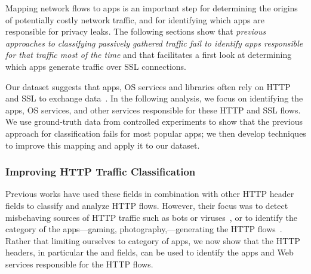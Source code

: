 Mapping network flows to apps is an important step for determining the origins of potentially costly 
network traffic, and for identifying which apps are responsible for privacy leaks. The following 
sections show that  \emph{previous approaches to classifying passively gathered traffic fail to identify
apps responsible for that traffic most of the time} and that \meddle facilitates a first look at 
determining which apps generate traffic over SSL connections.





Our \mobWild dataset suggests that apps, OS services and libraries often rely on HTTP and SSL to exchange data~\cite{maier:mobtraffic,falaki:mobileusage,xu:appusage}.
In the following analysis, we focus on identifying the apps, OS services, and other services responsible for these HTTP and SSL flows. 
We use ground-truth data from controlled experiments to show that the previous approach for classification fails 
for most popular apps; we then develop techniques to improve this mapping and apply it to our \mobWild dataset. 

\subsubsection{Improving HTTP Traffic Classification}

Previous works have used these fields in combination with other HTTP header fields to classify and analyze HTTP flows.
However, their focus was to detect misbehaving sources of HTTP traffic such as bots or viruses~\cite{sommers:cellwificomp, perdisci:behavioralclustering, yegneswaran:nemean}, or to identify the category of the apps---gaming, photography,\etc---generating the HTTP flows~\cite{maier:mobtraffic,xu:appusage,falaki:imcphones,falaki:smartphoneusage}.
Rather that limiting ourselves to category of apps, we now show that the HTTP headers, in particular the \useragent and \httphost fields, can be used to identify the apps and Web services responsible for the HTTP flows.

